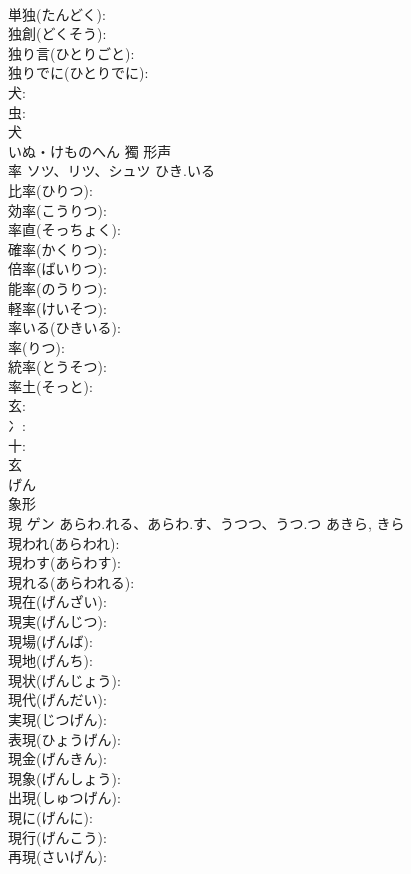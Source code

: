 \documentclass[8pt]{extreport}
\begin{document}
\begin{CJK}{UTF8}{min}
\\	単独(たんどく): 
\\	独創(どくそう): 
\\	独り言(ひとりごと): 
\\	独りでに(ひとりでに): 
\\	犬: 
\\	虫: 
\\	犬	
\\	いぬ・けものへん	獨	形声 
\\	率	ソツ、リツ、シュツ	ひき.いる		
\\	比率(ひりつ): 
\\	効率(こうりつ): 
\\	率直(そっちょく): 
\\	確率(かくりつ): 
\\	倍率(ばいりつ): 
\\	能率(のうりつ): 
\\	軽率(けいそつ): 
\\	率いる(ひきいる): 
\\	率(りつ): 
\\	統率(とうそつ): 
\\	率土(そっと): 
\\	玄: 
\\	冫: 
\\	十: 
\\	玄	
\\	げん	
\\	象形 
\\	現	ゲン	あらわ.れる、あらわ.す、うつつ、うつ.つ	あきら, きら	
\\	現われ(あらわれ): 
\\	現わす(あらわす): 
\\	現れる(あらわれる): 
\\	現在(げんざい): 
\\	現実(げんじつ): 
\\	現場(げんば): 
\\	現地(げんち): 
\\	現状(げんじょう): 
\\	現代(げんだい): 
\\	実現(じつげん): 
\\	表現(ひょうげん): 
\\	現金(げんきん): 
\\	現象(げんしょう): 
\\	出現(しゅつげん): 
\\	現に(げんに): 
\\	現行(げんこう): 
\\	再現(さいげん): 

\end{CJK}
\end{document}
